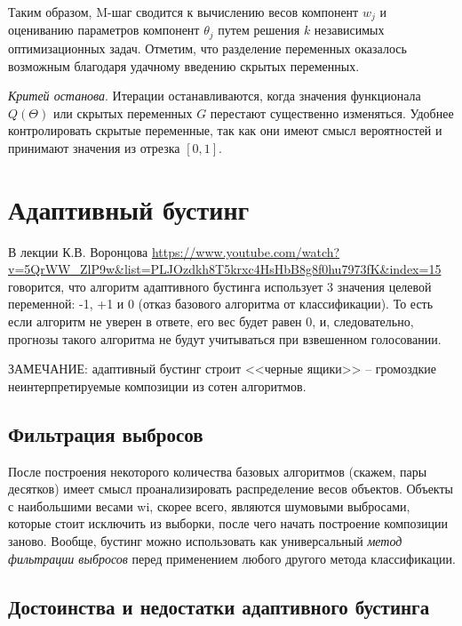 \documentclass[%
	11pt,
	a4paper,
	utf8,
		]{article}
\begin{document}
Таким образом, M-шаг сводится к вычислению весов компонент $ w_j $ и оцениванию параметров компонент $ \theta_j $ путем решения $ k $ независимых оптимизационных задач. Отметим, что разделение переменных оказалось возможным благодаря удачному введению скрытых переменных.

\emph{Критей останова}. Итерации останавливаются, когда значения функционала $ Q(\Theta) $ или скрытых переменных $ G $ перестают существенно изменяться. Удобнее контролировать скрытые переменные, так как они имеют смысл вероятностей и принимают значения из отрезка $ [0, 1] $.

\section{Адаптивный бустинг}

В лекции К.В. Воронцова \url{https://www.youtube.com/watch?v=5QrWW_ZlP9w&list=PLJOzdkh8T5krxc4HsHbB8g8f0hu7973fK&index=15} говорится, что алгоритм адаптивного бустинга использует 3 значения целевой переменной: -1, +1 и 0 (отказ базового алгоритма от классификации). То есть если алгоритм не уверен в ответе, его вес будет равен 0, и, следовательно, прогнозы такого алгоритма не будут учитываться при взвешенном голосовании.

ЗАМЕЧАНИЕ: адаптивный бустинг строит <<черные ящики>> -- громоздкие неинтерпретируемые композиции из сотен алгоритмов.

\subsection{Фильтрация выбросов}

После построения некоторого количества базовых алгоритмов (скажем, пары десятков) имеет смысл проанализировать распределение весов объектов. Объекты с наибольшими весами wi, скорее всего, являются шумовыми выбросами, которые стоит исключить из выборки, после чего начать построение композиции заново. Вообще, бустинг можно использовать как универсальный \emph{метод фильтрации выбросов} перед применением любого другого метода классификации.

\subsection{Достоинства и недостатки адаптивного бустинга}
\end{document}
